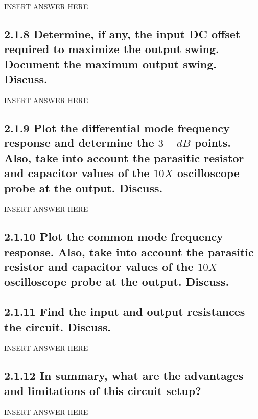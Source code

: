 \documentclass[12pt]{article}
\begin{document}
INSERT ANSWER HERE

\subsection*{2.1.8 Determine, if any, the input DC offset required to maximize the output swing. Document the maximum output swing. Discuss.}

INSERT ANSWER HERE

\subsection*{2.1.9 Plot the differential mode frequency response and determine the $3-dB$ points. Also, take into account the parasitic resistor and capacitor values of the $10X$ oscilloscope probe at the output. Discuss.  }

INSERT ANSWER HERE

\subsection*{2.1.10 Plot the common mode frequency response. Also, take into account the parasitic resistor and capacitor values of the $10X$ oscilloscope probe at the output. Discuss. }

\subsection*{2.1.11 Find the input and output resistances the circuit. Discuss. }

INSERT ANSWER HERE

\subsection*{2.1.12 In summary, what are the advantages and limitations of this circuit setup?}

INSERT ANSWER HERE
\end{document}
